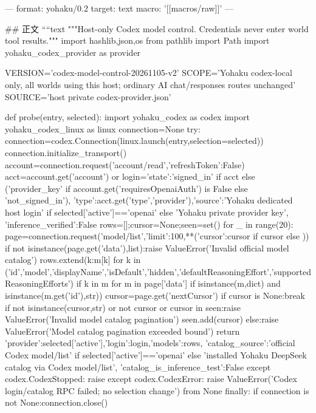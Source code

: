 ---
format: yohaku/0.2
target: text
macro: '[[macros/raw]]'
---

## 正文
````text
"""Host-only Codex model control. Credentials never enter world tool results."""
import hashlib,json,os
from pathlib import Path
import yohaku_codex_provider as provider

VERSION='codex-model-control-20261105-v2'
SCOPE='Yohaku codex-local only, all worlds using this host; ordinary AI chat/responses routes unchanged'
SOURCE='host private codex-provider.json'

def probe(entry, selected):
    import yohaku_codex as codex
    import yohaku_codex_linux as linux
    connection=None
    try:
        connection=codex.Connection(linux.launch(entry,selection=selected))
        connection.initialize_transport()
        account=connection.request('account/read',{'refreshToken':False})
        acct=account.get('account') or {}
        login={'state':'signed_in' if acct else ('provider_key' if account.get('requiresOpenaiAuth') is False else 'not_signed_in'),
               'type':acct.get('type','provider'),'source':'Yohaku dedicated host login' if selected['active']=='openai' else 'Yohaku private provider key',
               'inference_verified':False}
        rows=[];cursor=None;seen=set()
        for _ in range(20):
            page=connection.request('model/list',{'limit':100,**({'cursor':cursor} if cursor else {})})
            if not isinstance(page.get('data'),list):raise ValueError('Invalid official model catalog')
            rows.extend({k:m[k] for k in ('id','model','displayName','isDefault','hidden','defaultReasoningEffort','supportedReasoningEfforts') if k in m} for m in page['data'] if isinstance(m,dict) and isinstance(m.get('id'),str))
            cursor=page.get('nextCursor')
            if cursor is None:break
            if not isinstance(cursor,str) or not cursor or cursor in seen:raise ValueError('Invalid model catalog pagination')
            seen.add(cursor)
        else:raise ValueError('Model catalog pagination exceeded bound')
        return {'provider':selected['active'],'login':login,'models':rows,
                'catalog_source':'official Codex model/list' if selected['active']=='openai' else 'installed Yohaku DeepSeek catalog via Codex model/list',
                'catalog_is_inference_test':False}
    except codex.CodexStopped:
        raise
    except codex.CodexError:
        raise ValueError('Codex login/catalog RPC failed; no selection change') from None
    finally:
        if connection is not None:connection.close()

